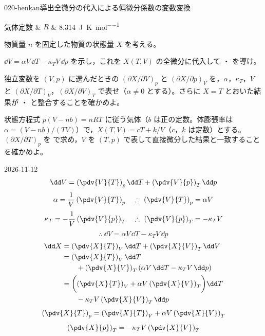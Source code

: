 \documentclass[uplatex,dvipdfmx,a4paper,11pt]{jsarticle}
\begin{document}
\begin{mondai}{020-henkan}{導出}{全微分の代入による偏微分係数の変数変換}
\begin{teisuu}
  気体定数 & $R$ & \qty{8.314}{\joule\per\kelvin\per\mole}\\
\end{teisuu}
物質量 $n$ を固定した物質の状態量 $X$ を考える。
  \begin{shoumon}
    \item $\dd V = \alpha V\,\dd T - \kappa_{T} V\,\dd p$ を示し，これを $X(T,V)$ の全微分に代入して ・ を導け。
    \item 独立変数を $(V,p)$ に選んだときの $(\partial X/\partial V)_{p}$ と $(\partial X/\partial p)_{V}$ を，$\alpha$，$\kappa_{T}$，$V$ と $(\partial X/\partial T)_{V}$，$(\partial X/\partial V)_{T}$ で表せ（$\alpha \neq 0$ とする）。さらに $X = T$ とおいた結果が ・ と整合することを確かめよ。
    \item 状態方程式 $p(V - nb) = nRT$ に従う気体（$b$ は正の定数。体膨張率は $\alpha = (V - nb)/(TV)$）で，$X(T,V) = cT + k/V$（$c$，$k$ は定数）とする。$(\partial X/\partial T)_{p}$ を  で求め，$V$ を $(T,p)$ で表して直接微分した結果と一致することを確かめよ。
  \end{shoumon}
\begin{kotaeutsushi}{2026-11-12}
\[ \dd V=\left(\pdv{V}{T}\right)_{p}\dd T+\left(\pdv{V}{p}\right)_{T}\dd p \]
\[ \alpha=\frac{1}{V}\left(\pdv{V}{T}\right)_{p} \quad \therefore\ \left(\pdv{V}{T}\right)_{p}=\alpha V \]
\[ \kappa_{T}=-\frac{1}{V}\left(\pdv{V}{p}\right)_{T} \quad \therefore\ \left(\pdv{V}{p}\right)_{T}=-\kappa_{T}V \]
\[ \therefore\ \dd V=\alpha V\,\dd T-\kappa_{T}V\,\dd p \]
\begin{align*}
\dd X&=\left(\pdv{X}{T}\right)_{V}\dd T+\left(\pdv{X}{V}\right)_{T}\dd V\\
&=\left(\pdv{X}{T}\right)_{V}\dd T\\
&\qquad+\left(\pdv{X}{V}\right)_{T}(\alpha V\,\dd T-\kappa_{T}V\,\dd p)\\
&=\biggl(\left(\pdv{X}{T}\right)_{V}+\alpha V\left(\pdv{X}{V}\right)_{T}\biggr)\dd T\\
&\qquad-\kappa_{T}V\left(\pdv{X}{V}\right)_{T}\dd p
\end{align*}
\[ \left(\pdv{X}{T}\right)_{p}=\left(\pdv{X}{T}\right)_{V}+\alpha V\left(\pdv{X}{V}\right)_{T} \]
\[ \left(\pdv{X}{p}\right)_{T}=-\kappa_{T}V\left(\pdv{X}{V}\right)_{T} \]

\end{kotaeutsushi}
\end{mondai}
\end{document}
